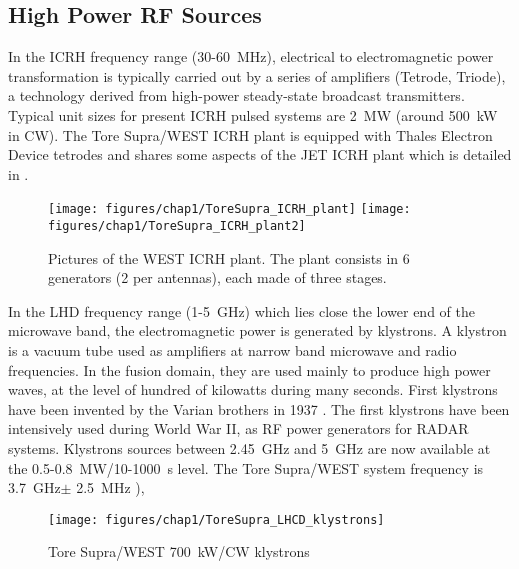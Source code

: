 \subsection{High Power RF Sources}


In the ICRH frequency range (30-60~\si{MHz}), electrical to electromagnetic power transformation is typically carried out by a series of amplifiers (Tetrode, Triode), a technology derived from high-power steady-state broadcast transmitters. Typical unit sizes for present ICRH pulsed systems are 2~\si{MW} (around 500~\si{kW} in CW). The Tore Supra/WEST ICRH plant is equipped with Thales Electron Device tetrodes and shares some aspects of the JET ICRH plant which is detailed in .

\begin{figure}[h]
	\centering
	\texttt{[image: figures/chap1/ToreSupra\_ICRH\_plant]}
	\texttt{[image: figures/chap1/ToreSupra\_ICRH\_plant2]}
	\caption{Pictures of the WEST ICRH plant. The plant consists in 6 generators (2 per antennas), each made of three stages.}
	\label{fig:toresupraicrhplant}
\end{figure}

In the LHD frequency range (1-5~\si{GHz}) which lies close the lower end of the microwave band, the electromagnetic power is generated by klystrons. A klystron is a vacuum tube used as amplifiers at narrow band microwave and radio frequencies. In the fusion domain, they are used mainly to produce high power waves, at the level of hundred of kilowatts during many seconds. First klystrons have been invented by the Varian brothers in 1937 . The first klystrons have been intensively used during World War II, as RF power generators for RADAR systems. Klystrons sources between 2.45~\si{GHz} and 5~\si{GHz} are now available at the 0.5-0.8~\si{MW}/10-1000~\si{s} level. The Tore Supra/WEST system frequency is 3.7~\si{GHz}$\pm$ 2.5~\si{MHz} ),

\begin{figure}[h]
	\centering
	\texttt{[image: figures/chap1/ToreSupra\_LHCD\_klystrons]}
	\caption{Tore Supra/WEST 700~kW/CW klystrons}
	\label{fig:toresupralhcdklystrons}
\end{figure}


